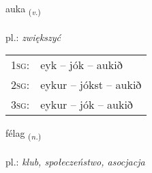 \documentclass[frontgrid, backgrid]{flacards}\usepackage[]{graphicx}\usepackage[]{xcolor}
\begin{document}
\renewcommand{\blhead}{\vskip5pt {\small\bfseries\footnotesize Sagnorð | Verb }}
\renewcommand{\bcfoot}{\vskip5pt \hspace{2pt}{\small\bfseries\footnotesize 1K}}


{auka \small{\textsubscript{(\textit{v.})}} \\[1ex] %
\textphonetic{[œiːka]} \\
pl.: \emph{zwiększyć} \\  [2ex]
\renewcommand*{\arraystretch}{0.8}
\begin{tabular}{p{1cm}l}
\textsc{1sg}: & eyk -- jók -- aukið \\ 
\textsc{2sg}: & eykur -- jókst -- aukið \\ 
\textsc{3sg}: & eykur -- jók -- aukið \\ 
\end{tabular}
}

\renewcommand{\flhead}{\vskip5pt \fboxsep=0pt {\small\bfseries\footnotesize Nafnorð | Noun}}
\renewcommand{\fcfoot}{\vskip5pt \fboxsep=0pt \hspace{2pt}{\small\bfseries\footnotesize 1K}}

\renewcommand{\blhead}{\vskip5pt {\small\bfseries\footnotesize Nafnorð | Noun }}
\renewcommand{\bcfoot}{\vskip5pt \hspace{2pt}{\small\bfseries\footnotesize 1K}}


{félag \small{\textsubscript{(\textit{n.})}} \\[1ex] %
\textphonetic{[fjɛːlaɣ]} \\
pl.: \emph{klub, społeczeństwo, asocjacja} \\  [2ex]
\renewcommand*{\arraystretch}{0.8}
}

\renewcommand{\flhead}{\vskip5pt \fboxsep=0pt {\small\bfseries\footnotesize Nafnorð | Noun}}
\renewcommand{\fcfoot}{\vskip5pt \fboxsep=0pt \hspace{2pt}{\small\bfseries\footnotesize 1K}}
\end{document}
